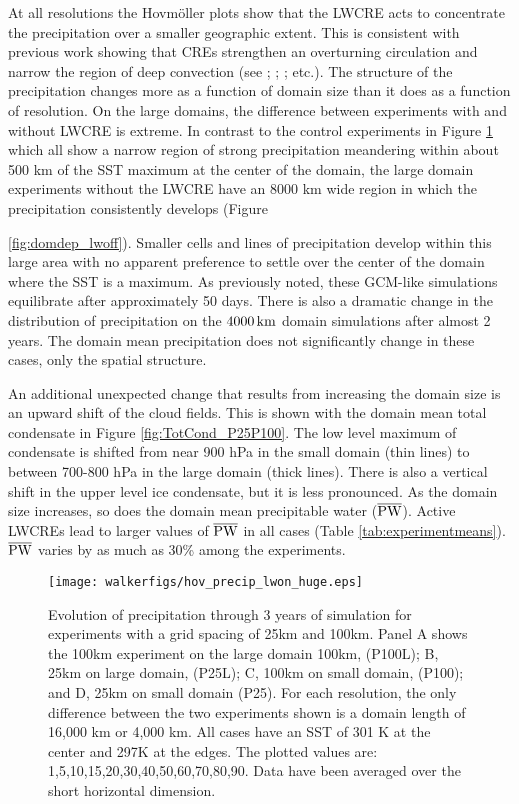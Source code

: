\documentclass[draft]{agujournal2019}
\begin{document}
At all resolutions the Hovm{\"o}ller plots show that the LWCRE acts to concentrate the 
precipitation over a smaller geographic extent.   This is consistent with previous work showing that CREs 
strengthen an overturning circulation and narrow the region of deep convection (see ; 
; ;   etc.).  The structure of the precipitation changes more 
as a function of domain size than it does as a function of resolution. 
On the large domains, the difference between experiments with and without LWCRE is extreme.  
In contrast to the control experiments in Figure {\ref{fig:domdep}} which all show a narrow region of strong 
precipitation meandering within about 500 km of the SST maximum at the center of the domain,  the large domain experiments 
without the LWCRE have an 8000 km wide region in which the precipitation consistently develops (Figure {\ref{fig:domdep_lwoff}).  
Smaller cells and lines of precipitation develop within this large area with no apparent preference to settle
over the center of the domain where the SST is a maximum.  As previously noted, 
these GCM-like simulations equilibrate after approximately 50 days.  There is also a dramatic change in 
the distribution of precipitation on the $4000\, \rm{km}$ domain simulations after almost 2 years.   The domain mean 
precipitation does not significantly change in these cases, only the spatial structure. 

An additional unexpected change that results from increasing the domain size is an upward shift of the cloud fields.  This is 
shown with the domain mean total condensate in Figure \ref{fig:TotCond_P25P100}.  The  low level maximum of 
condensate is shifted from near 900 hPa in the small domain (thin lines) to between 700-800 hPa in 
the large domain (thick lines).  There is also a vertical shift in the upper level ice condensate, but it is less
pronounced.  
As the domain size increases, so does the domain mean precipitable water ($\overline{\rm{PW}}$).  Active LWCREs lead
to larger values of $\overline{\rm{PW}}$ in all cases (Table \ref{tab:experimentmeans}).  
$\overline{\rm{PW}}$ varies by as much as 30\% among the experiments.  


\begin{figure}
  \texttt{[image: walkerfigs/hov\_precip\_lwon\_huge.eps]}
  \caption{Evolution of precipitation through 3 years of simulation for experiments with a grid spacing of
  25km and 100km.  Panel A shows the 100km experiment on the large domain 100km, (P100L); 
  B, 25km on large domain, (P25L); C, 100km on small domain, (P100); and D, 25km on small domain 
  (P25).  For each resolution, the only difference between the two experiments shown is a domain length of 
  16,000 km or 4,000 km.  All cases have an SST of 301 K at the center and 297K at the edges.  The plotted values are: 1,5,10,15,20,30,40,50,60,70,80,90.  Data have been averaged over the short horizontal dimension.}
  \label{fig:domdep}
\end{figure}

}
\end{document}
